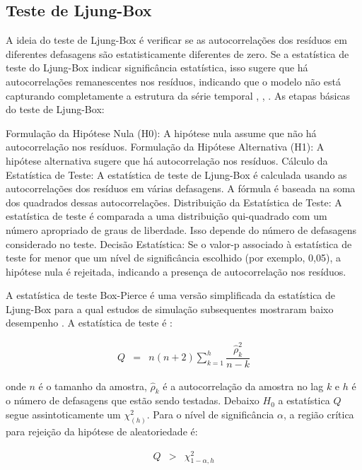  \subsection{Teste de Ljung-Box}
 
A ideia do teste de Ljung-Box é verificar se as autocorrelações dos resíduos em diferentes defasagens são estatisticamente diferentes de zero. Se a estatística de teste do Ljung-Box indicar significância estatística, isso sugere que há autocorrelações remanescentes nos resíduos, indicando que o modelo não está capturando completamente a estrutura da série temporal \cite{box}, \cite{ljung}, \cite{dav}. As etapas básicas do teste de Ljung-Box:

Formulação da Hipótese Nula (H0): A hipótese nula assume que não há autocorrelação nos resíduos.
Formulação da Hipótese Alternativa (H1): A hipótese alternativa sugere que há autocorrelação nos resíduos.
Cálculo da Estatística de Teste: A estatística de teste de Ljung-Box é calculada usando as autocorrelações dos resíduos em várias defasagens. A fórmula é baseada na soma dos quadrados dessas autocorrelações.
Distribuição da Estatística de Teste: A estatística de teste é comparada a uma distribuição qui-quadrado com um número apropriado de graus de liberdade. Isso depende do número de defasagens considerado no teste.
Decisão Estatística: Se o valor-p associado à estatística de teste for menor que um nível de significância escolhido (por exemplo, 0,05), a hipótese nula é rejeitada, indicando a presença de autocorrelação nos resíduos.
 
A estatística de teste Box-Pierce é uma versão simplificada da estatística de Ljung-Box para a qual estudos de simulação subsequentes mostraram baixo desempenho \cite{dav}. A estatística de teste é \cite{ljung}:
 
 \begin{eqnarray}
 	Q&=&n(n+2) \sum_{k=1}^h \dfrac{\hat{\rho}_k^2}{n-k}
 \end{eqnarray}
 
\noindent onde $n$ é o tamanho da amostra, $\hat{\rho}_k$ é a autocorrelação da amostra no lag $k$ e $h$ é o número de defasagens que estão sendo testadas. Debaixo $H_0$ a estatística $Q$ segue assintoticamente um $\chi_{(h)}^2$. Para o nível de significância $\alpha$, a região crítica para rejeição da hipótese de aleatoriedade é:
 
\begin{eqnarray}
 	Q&>&\chi_{1-\alpha, h}^2
\end{eqnarray}
 
